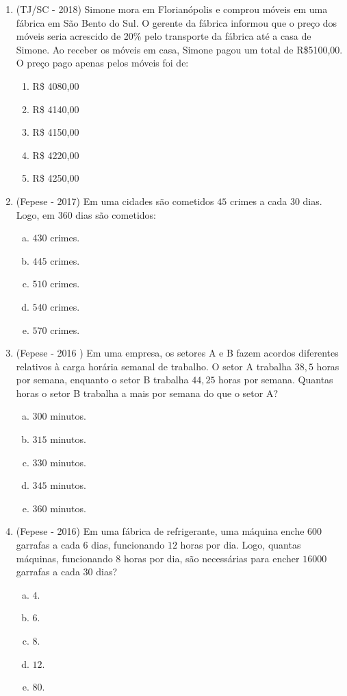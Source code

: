 \begin{enumerate}
 \item (TJ/SC - 2018) Simone mora em Florianópolis e comprou móveis em uma fábrica em São Bento do Sul. O gerente da fábrica informou que o preço dos móveis seria acrescido de 20\% pelo transporte da fábrica até a casa de Simone.
  Ao receber os móveis em casa, Simone pagou um total de R\$5100,00. O preço pago apenas pelos móveis foi de:
  \begin{enumerate}
  \item R\$ 4080,00 
  \item R\$ 4140,00
  \item R\$ 4150,00
  \item R\$ 4220,00
  \item R\$ 4250,00
 \end{enumerate}

  \item (Fepese - 2017) Em uma cidades são cometidos $45$ crimes a cada $30$ dias. Logo, em $360$ dias são cometidos: 
   \begin{enumerate}[a)]
   \item $430$ crimes.
   \item $445$ crimes.
   \item $510$ crimes.
   \item $540$ crimes.
   \item $570$ crimes.
   \end{enumerate}

 \item (Fepese - 2016 ) Em uma empresa, os setores A e B fazem acordos diferentes relativos à carga horária semanal de trabalho. O setor A trabalha $38,5$ horas por semana, enquanto o setor B trabalha $44,25$ horas por semana. Quantas horas o setor B trabalha a mais por semana do que o setor A?
 \begin{enumerate}[a)]
   \item $300$ minutos.
   \item $315$ minutos.
   \item $330$ minutos.
   \item $345$ minutos.
   \item $360$ minutos.
   \end{enumerate}

 \item (Fepese - 2016) Em uma fábrica de refrigerante, uma máquina enche $600$ garrafas a cada $6$ dias, funcionando $12$ horas por dia. Logo, quantas máquinas, funcionando $8$ horas por dia, são necessárias para encher $16000$ garrafas a cada $30$ dias?
 \begin{enumerate}[a)]
   \item $4$.
   \item $6$.
   \item $8$.
   \item $12$.
   \item $80$.
   \end{enumerate}
 

\end{enumerate}
